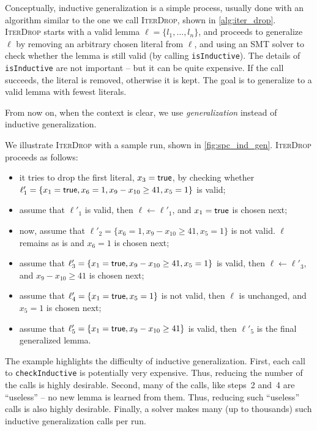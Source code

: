 

Conceptually, inductive generalization is a simple process, usually done with an
algorithm similar to the one we call \textsc{IterDrop}, shown in
\cref{alg:iter_drop}. \textsc{IterDrop} starts with a valid lemma $\ell = \{l_1,
\ldots, l_n\}$, and proceeds to generalize $\ell$ by removing an arbitrary
chosen literal from $\ell$, and using an SMT solver to check whether the lemma
is still valid (by calling \texttt{isInductive}). 
The details of \texttt{isInductive} are not important -- but it can be quite expensive. If the call succeeds, the literal is removed, otherwise it is kept. The goal is to generalize to a valid lemma with fewest literals.

From now on, when the context is clear, we use \emph{generalization} instead of inductive generalization.



We illustrate \textsc{IterDrop} with a sample run,  shown in
\cref{fig:spc_ind_gen}. \textsc{IterDrop} proceeds as follows:
\begin{itemize}
\item it tries to drop the first literal, $x_3 = \textsf{true}$, by checking whether
  $\ell'_1=\{x_1 = \textsf{true}, x_6 = 1, x_9 - x_{10} \geq 41, x_5 = 1\}$ is
  valid;
\item assume that $\ell'_1$ is valid, then $\ell \gets \ell'_1$, and $x_1 = \textsf{true}$ is chosen next;
\item now, assume that $\ell'_2 = \{x_6 = 1, x_9 - x_{10} \geq 41, x_5 = 1\}$ is
  not valid. $\ell$ remains as is and $x_6 = 1$ is chosen next;
\item assume that $\ell'_3 = \{ x_1 = \textsf{true}, x_9 - x_{10} \geq 41, x_5 = 1\}$ is valid, then
  $\ell \gets \ell'_3$, and $x_9 - x_{10} \geq 41$ is chosen next;
\item assume that $\ell'_4 = \{x_1 = \textsf{true}, x_5 = 1\}$ is not valid,
  then $\ell$ is unchanged, and $x_5 = 1$ is chosen next;
\item assume that $\ell'_5 = \{ x_1 = \textsf{true}, x_9 - x_{10} \geq 41\}$ is valid, then
  $\ell'_5$ is the final generalized lemma.
\end{itemize}
The example highlights the difficulty of inductive generalization. First, each
call to \texttt{checkInductive} is potentially very expensive. Thus, reducing
the number of the calls is highly desirable. Second, many of the calls, like
steps~2 and~4 are ``useless'' -- no new lemma is learned from them. Thus,
reducing such ``useless'' calls is also highly desirable. Finally, a solver
makes many (up to thousands) such inductive generalization calls per run.

